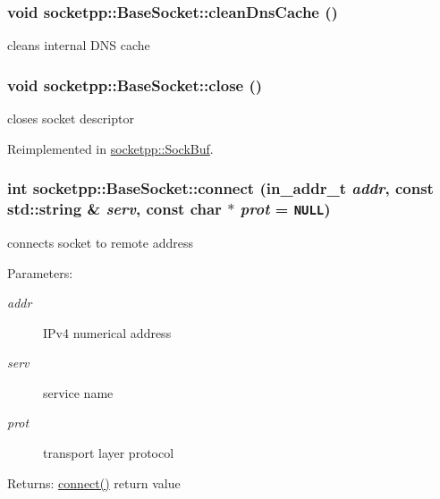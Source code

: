 \begin{CompactItemize}
{\subsubsection[{cleanDnsCache}]{\setlength{\rightskip}{0pt plus 5cm}void socketpp::BaseSocket::cleanDnsCache ()}}
\label{classsocketpp_1_1BaseSocket_f3a4c01a7bf911460296a873ce0913da}


cleans internal DNS cache 

\hypertarget{classsocketpp_1_1BaseSocket_f067195056bb6b5a65c4bc1d2ac7da72}{
\subsubsection[{close}]{\setlength{\rightskip}{0pt plus 5cm}void socketpp::BaseSocket::close ()}}
\label{classsocketpp_1_1BaseSocket_f067195056bb6b5a65c4bc1d2ac7da72}


closes socket descriptor 



Reimplemented in \hyperlink{classsocketpp_1_1SockBuf_28f88c6ac0570ee5e9d57e255733b0f9}{socketpp::SockBuf}.\hypertarget{classsocketpp_1_1BaseSocket_83666b030a93368675a842a992e0c2af}{
\subsubsection[{connect}]{\setlength{\rightskip}{0pt plus 5cm}int socketpp::BaseSocket::connect (in\_\-addr\_\-t {\em addr}, \/  const std::string \& {\em serv}, \/  const char $\ast$ {\em prot} = {\tt NULL})}}
\label{classsocketpp_1_1BaseSocket_83666b030a93368675a842a992e0c2af}


connects socket to remote address 

\begin{Desc}
\item[Parameters:]
\begin{description}
\item[{\em addr}]IPv4 numerical address \item[{\em serv}]service name \item[{\em prot}]transport layer protocol \end{description}
\end{Desc}
\begin{Desc}
\item[Returns:]\hyperlink{classsocketpp_1_1BaseSocket_769710192256606aaec1a776468d75fa}{connect()} return value \end{Desc}
\hypertarget{classsocketpp_1_1BaseSocket_eb0f4c84546c22fd9023169701d8fae8}{
}
\end{CompactItemize}
